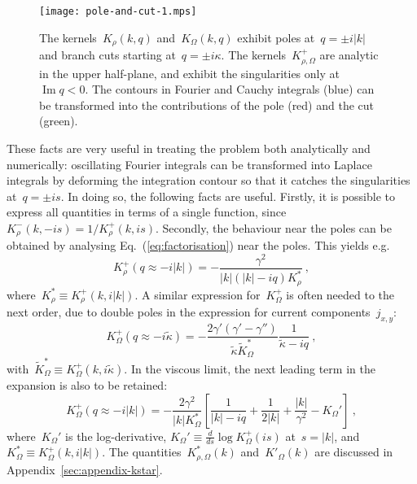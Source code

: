 \documentclass[preprint,aps,eqsecnum]{revtex4-1}
\newcommand{\fplus}[1]{{#1}^{+}}
\newcommand{\fminus}[1]{{#1}^{-}}
\renewcommand{\Im}{\mathop{\mathrm{Im}}\nolimits}
\begin{document}
\begin{figure}
  \texttt{[image: pole-and-cut-1.mps]}
  \caption{
   \label{fig:contours}
   The kernels~$K_\rho(k, q)$ and~$K_\Omega(k, q)$ exhibit poles
   at~$q = \pm i |k|$ and branch cuts starting at~$q = \pm i \kappa$.
   The kernels~$\fplus{K}_{\rho, \Omega}$ are analytic in the upper half-plane,
   and exhibit the singularities only at~$\Im q < 0$. 
   The contours in Fourier and Cauchy integrals (blue)  can be transformed
   into the contributions of the pole (red) and the cut (green).}
\end{figure}

These facts are very useful in treating the problem both analytically and
numerically: oscillating Fourier integrals can be transformed into Laplace
integrals by deforming the integration contour so that
it catches the singularities at~$q = \pm is$.
In doing so, the following facts are useful. Firstly,
it is possible to express all quantities in terms of a single function,
 since~$\fminus{K}_\rho(k, -is) = 1/\fplus{K}_\rho(k, is)$.  Secondly,
the behaviour near the poles can be obtained by analysing
Eq.~(\ref{eq:factorisation}) near the poles. This yields e.g. \begin{equation}
\fplus{K}_\rho (q \approx -i |k|) = - \frac{\gamma^2}{|k|(|k| - i q) K_\rho^\ast}
\ ,
\end{equation}
 where~$K_\rho^\ast \equiv \fplus{K}_\rho(k, i|k|)$. A similar expression
 for~$\fplus{K}_\Omega$ is often needed to the next order, due to double poles
in the expression for current components~$j_{x, y}$:
 \begin{equation}
 \fplus{K}_\Omega(q \approx -i {\tilde \kappa})
 = - \frac{2 \gamma' (\gamma' - \gamma'') }{{\tilde \kappa}
     {\tilde K}_\Omega^\ast}
      \frac{1}{{\tilde \kappa} - i q}
 \ ,
\end{equation}
with~${\tilde K}_\Omega^\ast \equiv \fplus{K}_\Omega(k, i{\tilde \kappa})$.
In the viscous limit, the next leading term in the expansion
is also to be retained:
 \begin{equation}
 \fplus{K}_\Omega(q \approx -i |k|)
 = - \frac{2 \gamma^2 }{|k| K_\Omega^\ast}
      \left[
      \frac{1}{|k| - i q}
       + \frac{1}{2|k|} + \frac{|k|}{\gamma^2} - K_\Omega'\right]
 \ ,
\end{equation}
where~$K_\Omega'$ is the log-derivative,
$K_\Omega' \equiv \frac{d}{ds} \log \fplus{K}_\Omega(is)$ at~$s = |k|$,
and~$K_\Omega^\ast \equiv \fplus{K}_\Omega(k, i|k|)$.
The quantities~$K_{\rho,\Omega}^\ast(k)$ and~$K'_\Omega(k)$ are discussed
in Appendix~\ref{sec:appendix-kstar}. 
\end{document}
